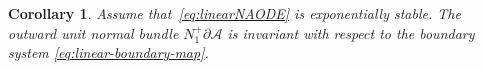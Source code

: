 \documentclass[reqno]{amsart}
\newtheorem{cor}[thm]{Corollary}
\theoremstyle{definition}
\numberwithin{equation}{section}
\newcommand{\R}{\mathbb{R}}
\newcommand{\A}{\mathcal{A}}
\begin{document}
\begin{cor}\label{thm:BM-NAODE-linear}
    Assume that~\eqref{eq:linearNAODE} is exponentially stable. The outward unit normal bundle $N^+_1\partial \A$ is invariant with respect to the boundary system \eqref{eq:linear-boundary-map}.
\end{cor}

\end{document}
